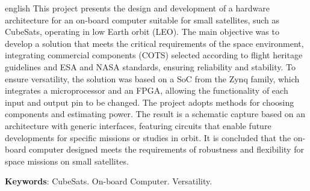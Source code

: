 \documentclass[
12pt,				%
oneside,			%
a4paper,			%
chapter=TITLE,		%
section=TITLE,		%
english,			%
brazil				%
hyperref=hidelinks]{abntex2}
\begin{document}
\begin{resumo}[Abstract]
\begin{otherlanguage*}{english}
This project presents the design and development of a hardware architecture for an on-board computer suitable for small satellites, such as CubeSats, operating in low Earth orbit (LEO). The main objective was to develop a solution that meets the critical requirements of the space environment, integrating commercial components (COTS) selected according to flight heritage guidelines and ESA and NASA standards, ensuring reliability and stability. To ensure versatility, the solution was based on a SoC from the Zynq family, which integrates a microprocessor and an FPGA, allowing the functionality of each input and output pin to be changed. The project adopts methods for choosing components and estimating power. The result is a schematic capture based on an architecture with generic interfaces, featuring circuits that enable future developments for specific missions or studies in orbit. It is concluded that the on-board computer designed meets the requirements of robustness and flexibility for space missions on small satellites.
\vspace{\onelineskip}
\noindent 

\textbf{Keywords}: CubeSats. On-board Computer. Versatility.
 \end{otherlanguage*}
\end{resumo}

\imprimirlistafiguras


\imprimirlistatabelas
\end{document}

